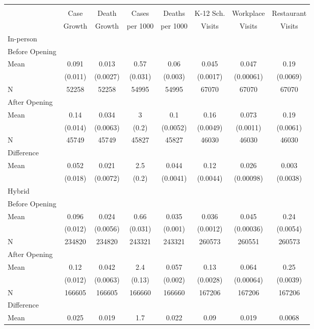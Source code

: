 \begin{tabular}{@{\extracolsep{5pt}}lccccccc}
\\[-1.8ex]\hline
\hline \\
  & Case  & Death  & Cases & Deaths & K-12 Sch. & Workplace   & Restaurant  \\
  &  Growth &  Growth & per 1000 & per 1000 &  Visits &  Visits & Visits \\ \hline
 In-person \\
 \qquad Before Opening \\
\qquad\quad Mean & 0.091 & 0.013 & 0.57 & 0.06 & 0.045 & 0.047 & 0.19 \\
   & (0.011) & (0.0027) & (0.031) & (0.003) & (0.0017) & (0.00061) & (0.0069) \\
 \qquad\quad N & 52258 & 52258 & 54995 & 54995 & 67070 & 67070 & 67070 \\
\qquad After Opening \\
\qquad\quad Mean & 0.14 & 0.034 & 3 & 0.1 & 0.16 & 0.073 & 0.19 \\
   & (0.014) & (0.0063) & (0.2) & (0.0052) & (0.0049) & (0.0011) & (0.0061) \\
 \qquad\quad N & 45749 & 45749 & 45827 & 45827 & 46030 & 46030 & 46030 \\
\qquad Difference \\
\qquad\quad Mean & 0.052 & 0.021 & 2.5 & 0.044 & 0.12 & 0.026 & 0.003 \\
   & (0.018) & (0.0072) & (0.2) & (0.0041) & (0.0044) & (0.00098) & (0.0038) \\
 Hybrid \\
 \qquad Before Opening \\
\qquad\quad Mean & 0.096 & 0.024 & 0.66 & 0.035 & 0.036 & 0.045 & 0.24 \\
   & (0.012) & (0.0056) & (0.031) & (0.001) & (0.0012) & (0.00036) & (0.0054) \\
 \qquad\quad N & 234820 & 234820 & 243321 & 243321 & 260573 & 260551 & 260573 \\
\qquad After Opening \\
\qquad\quad Mean & 0.12 & 0.042 & 2.4 & 0.057 & 0.13 & 0.064 & 0.25 \\
   & (0.012) & (0.0063) & (0.13) & (0.002) & (0.0028) & (0.00064) & (0.0039) \\
 \qquad\quad N & 166605 & 166605 & 166660 & 166660 & 167206 & 167206 & 167206 \\
\qquad Difference \\
\qquad\quad Mean & 0.025 & 0.019 & 1.7 & 0.022 & 0.09 & 0.019 & 0.0068 \\

\end{tabular}
